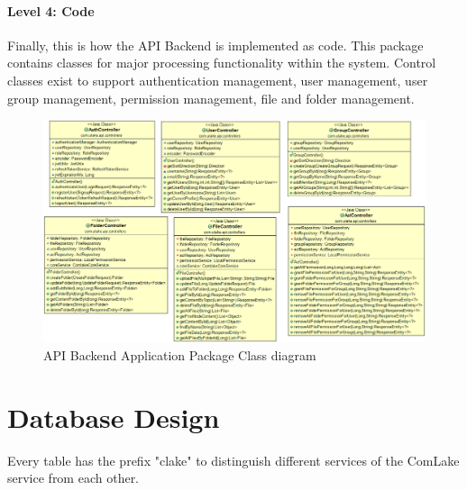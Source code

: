 \paragraph{Level 4: Code}
Finally, this is how the API Backend is implemented as code. This package contains classes for major processing functionality within the system. Control classes exist to support authentication management, user management, user group management, permission management, file and folder management.
\begin{figure}[H]
    \centering
    \includegraphics[width=1.0\textwidth]{images/package.png}
    \caption{API Backend Application Package Class diagram}
    \label{fig:C4}
\end{figure}

\section{Database Design}
Every table has the prefix "clake" to distinguish different services of the ComLake service from each other. 

